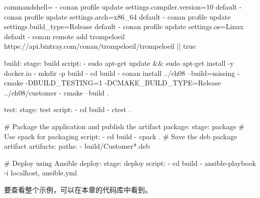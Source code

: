 \begin{tcblisting}{commandshell={}}
    - conan profile update settings.compiler.version=10 default
    - conan profile update settings.arch=x86_64 default
    - conan profile update settings.build_type=Release default
    - conan profile update settings.os=Linux default
    - conan remote add trompeloeil
https://api.bintray.com/conan/trompeloeil/trompeloeil || true

build:
  stage: build
  script:
    - sudo apt-get update && sudo apt-get install -y docker.io
    - mkdir -p build
    - cd build
    - conan install ../ch08 --build=missing
    - cmake -DBUILD_TESTING=1 -DCMAKE_BUILD_TYPE=Release ../ch08/customer
    - cmake --build .

test:
  stage: test
  script:
    - cd build
    - ctest .
    
# Package the application and publish the artifact
package:
  stage: package
  # Use cpack for packaging
  script:
    - cd build
    - cpack .
# Save the deb package artifact
artifacts:
  paths:
    - build/Customer*.deb

# Deploy using Ansible
deploy:
  stage: deploy
  script:
    - cd build
    - ansible-playbook -i localhost, ansible.yml
\end{tcblisting}

要查看整个示例，可以在本章的代码库中看到。
